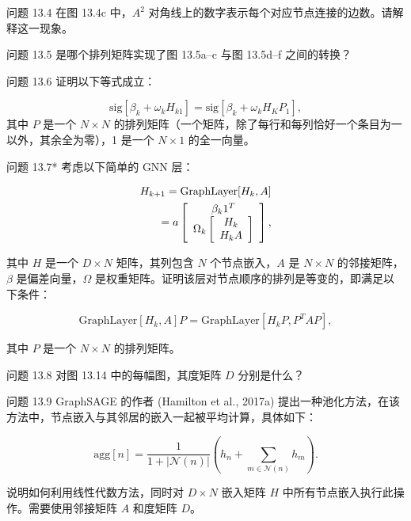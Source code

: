 \documentclass[lang=cn,newtx,10pt,scheme=chinese]{elegantbook}
\begin{document}
问题 13.4 在图 13.4c 中，\(A^2\) 对角线上的数字表示每个对应节点连接的边数。请解释这一现象。

问题 13.5 是哪个排列矩阵实现了图 13.5a–c 与图 13.5d–f 之间的转换？

问题 13.6 证明以下等式成立：

\begin{equation}
\text{sig}[\beta_k + \omega_k H_{k1}] = \text{sig}[\beta_k + \omega_k H_K P_{1}], 
\end{equation}
其中 \(P\) 是一个 \(N \times N\) 的排列矩阵（一个矩阵，除了每行和每列恰好一个条目为一以外，其余全为零），1 是一个 \(N \times 1\) 的全一向量。

问题 13.7* 考虑以下简单的 GNN 层：


\begin{align}
H_{k+1} = \text{GraphLayer}[H_k, A] \notag \\
= a \left[
\begin{array}{c}
\beta_k 1^T  \\
\Omega_k \left[ \begin{array}{c}
H_k  \\
H_k A \\
\end{array} \right]
\end{array}
\right], 
\end{align} 


其中 \(H\) 是一个 \(D \times N\) 矩阵，其列包含 \(N\) 个节点嵌入，\(A\) 是 \(N \times N\) 的邻接矩阵，\(\beta\) 是偏差向量，\(\Omega\) 是权重矩阵。证明该层对节点顺序的排列是等变的，即满足以下条件：

\begin{equation}
\text{GraphLayer}[H_k, A]P = \text{GraphLayer}[H_k P, P^T AP], 
\end{equation}

其中 \(P\) 是一个 \(N \times N\) 的排列矩阵。

问题 13.8 对图 13.14 中的每幅图，其度矩阵 \(D\) 分别是什么？

问题 13.9 GraphSAGE 的作者 (Hamilton et al., 2017a) 提出一种池化方法，在该方法中，节点嵌入与其邻居的嵌入一起被平均计算，具体如下：

\begin{equation}
\text{agg}[n] = \frac{1}{1 + |\mathcal{N}(n)|} \left( h_n + \sum_{m \in \mathcal{N}(n)} h_m \right). 
\end{equation}

说明如何利用线性代数方法，同时对 \(D \times N\) 嵌入矩阵 \(H\) 中所有节点嵌入执行此操作。需要使用邻接矩阵 \(A\) 和度矩阵 \(D\)。
\end{document}
